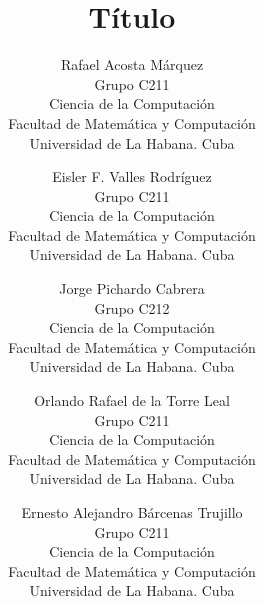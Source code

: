 \documentclass{wscpaperproc}
\theoremstyle{wsc}
\begin{document}
%
%

\title{T\'itulo}

\author{Rafael Acosta M\'arquez\\[12pt]
	Grupo C211\\
	Ciencia de la Computaci\'on\\
	Facultad de Matem\'atica y Computaci\'on\\
	Universidad de La Habana. Cuba\\
\and
Eisler F. Valles Rodr\'iguez\\[12pt]
Grupo C211\\
	Ciencia de la Computaci\'on\\
	Facultad de Matem\'atica y Computaci\'on\\
	Universidad de La Habana. Cuba\\
\and
Jorge Pichardo Cabrera\\[12pt]
Grupo C212\\
    Ciencia de la Computaci\'on\\
	Facultad de Matem\'atica y Computaci\'on\\
	Universidad de La Habana. Cuba\\
\and
Orlando Rafael de la Torre Leal\\[12pt]
Grupo C211\\
	Ciencia de la Computaci\'on\\
	Facultad de Matem\'atica y Computaci\'on\\
	Universidad de La Habana. Cuba\\
\and
Ernesto Alejandro B\'arcenas Trujillo\\[12pt]
Grupo C211\\
    Ciencia de la Computaci\'on\\
	Facultad de Matem\'atica y Computaci\'on\\
	Universidad de La Habana. Cuba\\
}
\end{document}
